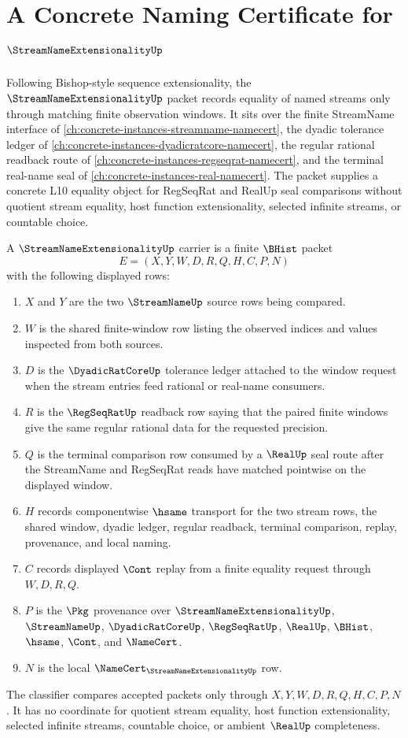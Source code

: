 \chapter{A Concrete Naming Certificate for $\StreamNameExtensionalityUp$}
\label{ch:concrete-instances-streamname-extensionality-namecert}

Following Bishop-style sequence extensionality, the $\StreamNameExtensionalityUp$ packet records equality of named streams only through matching finite observation windows. It sits over the finite StreamName interface of \autoref{ch:concrete-instances-streamname-namecert}, the dyadic tolerance ledger of \autoref{ch:concrete-instances-dyadicratcore-namecert}, the regular rational readback route of \autoref{ch:concrete-instances-regseqrat-namecert}, and the terminal real-name seal of \autoref{ch:concrete-instances-real-namecert}. The packet supplies a concrete L10 equality object for RegSeqRat and RealUp seal comparisons without quotient stream equality, host function extensionality, selected infinite streams, or countable choice.

\begin{definition}
\label{def:streamname-extensionality-carrier}
A $\StreamNameExtensionalityUp$ carrier is a finite $\BHist$ packet
$$
E=(X,Y,W,D,R,Q,H,C,P,N)
$$
with the following displayed rows:
\begin{enumerate}
\item $X$ and $Y$ are the two $\StreamNameUp$ source rows being compared.
\item $W$ is the shared finite-window row listing the observed indices and values inspected from both sources.
\item $D$ is the $\DyadicRatCoreUp$ tolerance ledger attached to the window request when the stream entries feed rational or real-name consumers.
\item $R$ is the $\RegSeqRatUp$ readback row saying that the paired finite windows give the same regular rational data for the requested precision.
\item $Q$ is the terminal comparison row consumed by a $\RealUp$ seal route after the StreamName and RegSeqRat reads have matched pointwise on the displayed window.
\item $H$ records componentwise $\hsame$ transport for the two stream rows, the shared window, dyadic ledger, regular readback, terminal comparison, replay, provenance, and local naming.
\item $C$ records displayed $\Cont$ replay from a finite equality request through $W,D,R,Q$.
\item $P$ is the $\Pkg$ provenance over $\StreamNameExtensionalityUp$, $\StreamNameUp$, $\DyadicRatCoreUp$, $\RegSeqRatUp$, $\RealUp$, $\BHist$, $\hsame$, $\Cont$, and $\NameCert$.
\item $N$ is the local $\NameCert_{\StreamNameExtensionalityUp}$ row.
\end{enumerate}
The classifier compares accepted packets only through $X,Y,W,D,R,Q,H,C,P,N$. It has no coordinate for quotient stream equality, host function extensionality, selected infinite streams, countable choice, or ambient $\RealUp$ completeness.
\end{definition}

